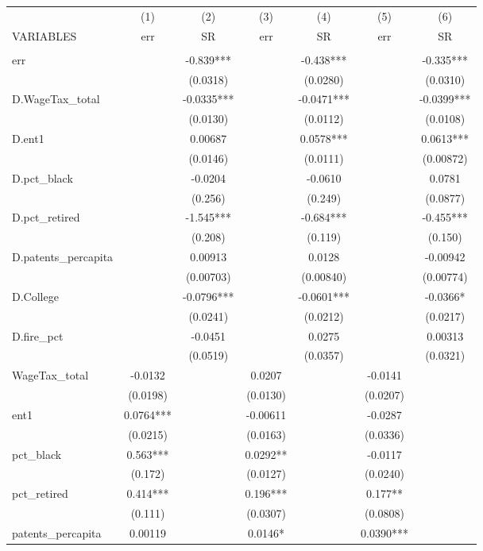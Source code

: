 \begin{tabular}{lcccccc} \hline
 & (1) & (2) & (3) & (4) & (5) & (6) \\
VARIABLES & err & SR & err & SR & err & SR \\ \hline
 &  &  &  &  &  &  \\
err &  & -0.839*** &  & -0.438*** &  & -0.335*** \\
 &  & (0.0318) &  & (0.0280) &  & (0.0310) \\
D.WageTax\_total &  & -0.0335*** &  & -0.0471*** &  & -0.0399*** \\
 &  & (0.0130) &  & (0.0112) &  & (0.0108) \\
D.ent1 &  & 0.00687 &  & 0.0578*** &  & 0.0613*** \\
 &  & (0.0146) &  & (0.0111) &  & (0.00872) \\
D.pct\_black &  & -0.0204 &  & -0.0610 &  & 0.0781 \\
 &  & (0.256) &  & (0.249) &  & (0.0877) \\
D.pct\_retired &  & -1.545*** &  & -0.684*** &  & -0.455*** \\
 &  & (0.208) &  & (0.119) &  & (0.150) \\
D.patents\_percapita &  & 0.00913 &  & 0.0128 &  & -0.00942 \\
 &  & (0.00703) &  & (0.00840) &  & (0.00774) \\
D.College &  & -0.0796*** &  & -0.0601*** &  & -0.0366* \\
 &  & (0.0241) &  & (0.0212) &  & (0.0217) \\
D.fire\_pct &  & -0.0451 &  & 0.0275 &  & 0.00313 \\
 &  & (0.0519) &  & (0.0357) &  & (0.0321) \\
WageTax\_total & -0.0132 &  & 0.0207 &  & -0.0141 &  \\
 & (0.0198) &  & (0.0130) &  & (0.0207) &  \\
ent1 & 0.0764*** &  & -0.00611 &  & -0.0287 &  \\
 & (0.0215) &  & (0.0163) &  & (0.0336) &  \\
pct\_black & 0.563*** &  & 0.0292** &  & -0.0117 &  \\
 & (0.172) &  & (0.0127) &  & (0.0240) &  \\
pct\_retired & 0.414*** &  & 0.196*** &  & 0.177** &  \\
 & (0.111) &  & (0.0307) &  & (0.0808) &  \\
patents\_percapita & 0.00119 &  & 0.0146* &  & 0.0390*** &  \\

\end{tabular}
